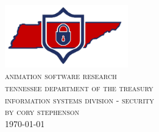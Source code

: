 \begin{titlepage}

\begin{center}
\includegraphics[width=0.4\textwidth]{new-logo.png} \\
[2.54cm]
\textsc{\Large animation software research} \\
[0.75cm]
\textsc{\Large tennessee department of the treasury} \\
[0.75cm]
\textsc{\Large information systems division - security} \\
[0.75cm]
\textsc{\Large by cory stephenson} \\
[0.75cm]
\textsc{\Large \today}\\
\end{center}
\end{titlepage}

\pagestyle{plain}
\tableofcontents
\listoftables
\listoffigures

\cleardoublepage
{}
